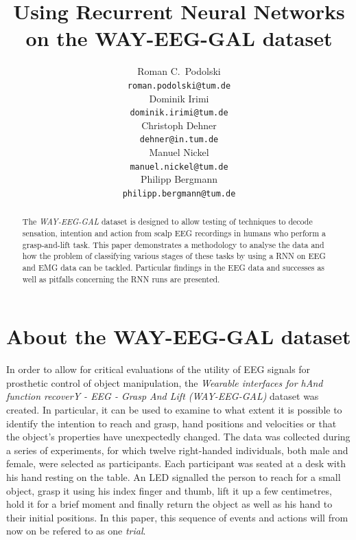 \documentclass{article} %
\title{Using Recurrent Neural Networks on the WAY-EEG-GAL dataset}
\author{
Roman C.~Podolski
\\
\texttt{roman.podolski@tum.de} \\
\And
Dominik Irimi \\
\texttt{dominik.irimi@tum.de} \\
\AND
Christoph Dehner \\
\texttt{dehner@in.tum.de} \\
\And
Manuel Nickel \\
\texttt{manuel.nickel@tum.de} \\
\And
Philipp Bergmann \\
\texttt{philipp.bergmann@tum.de} \\
}
\begin{document}
\maketitle

\begin{abstract}
The \emph{WAY-EEG-GAL} dataset is designed to allow testing of techniques to decode sensation, intention and action from scalp EEG recordings in humans who perform a grasp-and-lift task.
This paper demonstrates a methodology to analyse the data and how the problem of classifying various stages of these tasks by using a RNN on EEG and EMG data can be tackled.
Particular findings in the EEG data and successes as well as pitfalls concerning the RNN runs are presented.
\end{abstract}

\section{About the WAY-EEG-GAL dataset}
\label{sec:data}
In order to allow for critical evaluations of the utility of EEG signals for prosthetic control of object manipulation, the \emph{Wearable interfaces for hAnd function recoverY - EEG - Grasp And Lift (WAY-EEG-GAL)} dataset was created. In particular, it can be used to examine to what extent it is possible to identify the intention to reach and grasp, hand positions and velocities or that the object's properties have unexpectedly changed. The data was collected during a series of experiments, for which twelve right-handed individuals, both male and female, were selected as participants. Each participant was seated at a desk with his hand resting on the table. An LED signalled the person to reach for a small object, grasp it using his index finger and thumb, lift it up a few centimetres, hold it for a brief moment and finally return the object as well as his hand to their initial positions. In this paper, this sequence of events and actions will from now on be refered to as one \emph{trial}.
\end{document}
